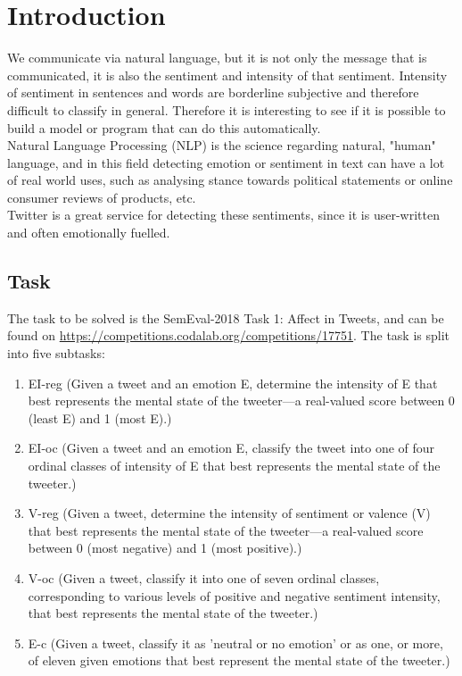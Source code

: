 \section{Introduction}
We communicate via natural language, but it is not only the message that is communicated, it is also the sentiment and intensity of that sentiment. Intensity of sentiment in sentences and words are borderline subjective and therefore difficult to classify in general. Therefore it is interesting to see if it is possible to build a model or program that can do this automatically. \\
Natural Language Processing (NLP) is the science regarding natural, "human" language, and in this field detecting emotion or sentiment in text can have a lot of real world uses, such as analysing stance towards political statements or online consumer reviews of products, etc. \\
Twitter is a great service for detecting these sentiments, since it is user-written and often emotionally fuelled.
\subsection{Task} \label{sec:task}
The task to be solved is the SemEval-2018 Task 1: Affect in Tweets, and can be found on \href{https://competitions.codalab.org/competitions/17751}{https://competitions.codalab.org/competitions/17751}. The task is split into five subtasks:\\
\begin{enumerate}
\item EI-reg (Given a tweet and an emotion E, determine the  intensity of E that best represents the mental state of the tweeter—a real-valued score between 0 (least E) and 1 (most E).)
\item EI-oc (Given a tweet and an emotion E, classify the tweet into one of four ordinal classes of intensity of E that best represents the mental state of the tweeter.)
\item V-reg (Given a tweet, determine the intensity of sentiment or valence (V) that best represents the mental state of the tweeter—a real-valued score between 0 (most negative) and 1 (most positive).)
\item V-oc (Given a tweet, classify it into one of seven ordinal classes, corresponding to various levels of positive and negative sentiment intensity, that best represents the mental state of the tweeter.)
\item E-c (Given a tweet, classify it as 'neutral or no emotion' or as one, or more, of eleven given emotions that best represent the mental state of the tweeter.)
\end{enumerate}
 
